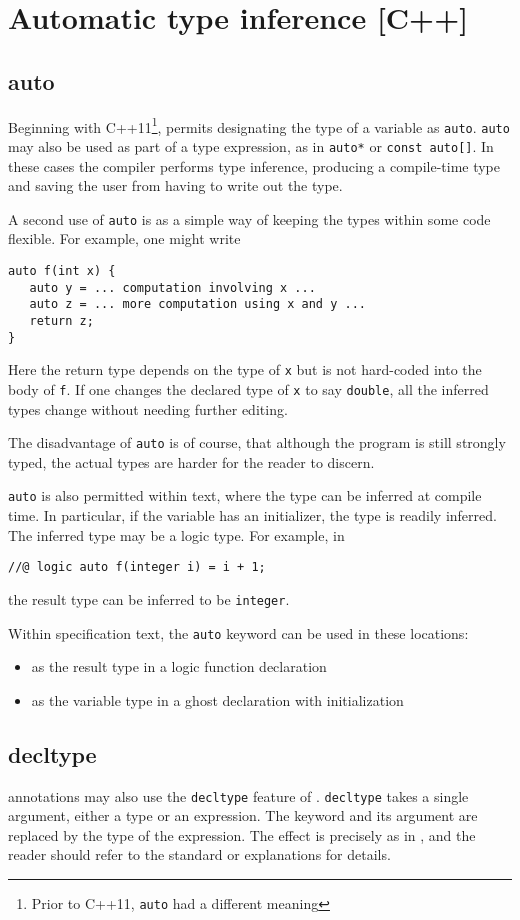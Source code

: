 \section{Automatic type inference [C++]}
\label{sec:auto}

\subsection{auto}
Beginning with C++11\footnote{Prior to C++11, \lstinline|auto| had a different meaning}, \lang permits designating the type of a variable as
\lstinline|auto|.
 \lstinline|auto| may also be used as part of a type expression, as in \lstinline|auto*| or \lstinline|const auto[]|. In these cases the compiler performs type inference, producing a compile-time type and
saving the user from having to write out the type.

A second use of \lstinline|auto| is as a simple way of keeping the types
within some code flexible. For example, one might write
\begin{lstlisting}
auto f(int x) {
   auto y = ... computation involving x ...
   auto z = ... more computation using x and y ...
   return z;
}
\end{lstlisting}
Here the return type depends on the type of \lstinline|x| but is not hard-coded into the body of \lstinline|f|. If one changes the declared type of
\lstinline|x| to say \lstinline|double|, all the inferred types change without needing further editing.

The disadvantage of \lstinline|auto| is of course, that although the 
program is still strongly typed, the actual types are harder for the reader to discern.

\lstinline|auto| is also permitted within \NAME text, where the type can be inferred at compile time.
In particular, if the variable has an initializer, the type is readily inferred.
 The inferred type may be a logic type. For example, in
\begin{lstlisting}
//@ logic auto f(integer i) = i + 1;
\end{lstlisting}
the result type can be inferred to be \lstinline|integer|.

Within \NAME specification text, the \lstinline|auto| keyword can be used in these locations:
\begin{itemize}
	\item as the result type in a logic function declaration
	\item as the variable type in a ghost declaration with initialization
\end{itemize}

\subsection{decltype}

\NAME annotations may also use the \lstinline|decltype| feature of \lang. \lstinline|decltype| takes a single argument, either a type or an expression. The keyword and its argument are
replaced by the type of the expression. The effect is precisely as in \lang, and the reader should refer to the \lang standard or explanations for details.


